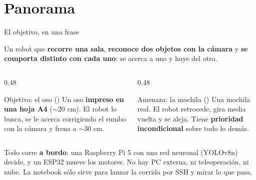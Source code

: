 \section{Panorama}

\begin{frame}{El objetivo, en una frase}
  \begin{alertblock}{}
    \centering\large
    Un robot que \textbf{recorre una sala}, \textbf{reconoce dos objetos con la
    cámara} y \textbf{se comporta distinto con cada uno}: se acerca a uno y huye
    del otro.
  \end{alertblock}

  \vspace{0.6em}
  \begin{columns}[T]
    \begin{column}{0.48\textwidth}
      \begin{block}{Objetivo: el oso ()}
        Un oso \textbf{impreso en una hoja A4} ($\sim$20 cm). El robot lo busca,
        se le acerca corrigiendo el rumbo con la cámara y frena a $\sim$30 cm.
      \end{block}
    \end{column}
    \begin{column}{0.48\textwidth}
      \begin{block}{Amenaza: la mochila ()}
        Una mochila real. El robot retrocede, gira media vuelta y se aleja.
        Tiene \textbf{prioridad incondicional} sobre todo lo demás.
      \end{block}
    \end{column}
  \end{columns}

  \vspace{0.6em}
  \small
  Todo corre \textbf{a bordo}: una Raspberry Pi 5 con una red neuronal
  (YOLOv8n) decide, y un ESP32 mueve los motores. No hay PC externa, ni
  teleoperación, ni nube. La notebook sólo sirve para lanzar la corrida por SSH
  y mirar lo que pasa.
\end{frame}

